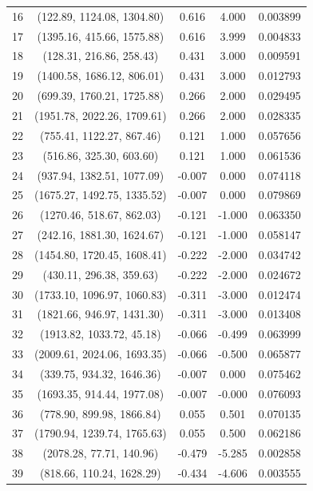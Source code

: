\begin{table}
\begin{tabular}{lcccc}
		16 &  (122.89, 1124.08, 1304.80)  &  0.616 &  4.000 &  0.003899 \\
		17 &  (1395.16, 415.66, 1575.88)  &  0.616 &  3.999 &  0.004833 \\
		18 &  (128.31, 216.86, 258.43)    &  0.431 &  3.000 &  0.009591 \\
		19 &  (1400.58, 1686.12, 806.01)  &  0.431 &  3.000 &  0.012793 \\
		20 &  (699.39, 1760.21, 1725.88)  &  0.266 &  2.000 &  0.029495 \\
		21 &  (1951.78, 2022.26, 1709.61) &  0.266 &  2.000 &  0.028335 \\
		22 &  (755.41, 1122.27, 867.46)   &  0.121 &  1.000 &  0.057656 \\
		23 &  (516.86, 325.30, 603.60)    &  0.121 &  1.000 &  0.061536 \\
		24 &  (937.94, 1382.51, 1077.09)  & -0.007 &  0.000 &  0.074118 \\
		25 &  (1675.27, 1492.75, 1335.52) & -0.007 &  0.000 &  0.079869 \\
		26 &  (1270.46, 518.67, 862.03)   & -0.121 & -1.000 &  0.063350 \\
		27 &  (242.16, 1881.30, 1624.67)  & -0.121 & -1.000 &  0.058147 \\
		28 &  (1454.80, 1720.45, 1608.41) & -0.222 & -2.000 &  0.034742 \\
		29 &  (430.11, 296.38, 359.63)    & -0.222 & -2.000 &  0.024672 \\
		30 &  (1733.10, 1096.97, 1060.83) & -0.311 & -3.000 &  0.012474 \\
		31 &  (1821.66, 946.97, 1431.30)  & -0.311 & -3.000 &  0.013408 \\
		32 &  (1913.82, 1033.72, 45.18)   & -0.066 & -0.499 &  0.063999 \\
		33 &  (2009.61, 2024.06, 1693.35) & -0.066 & -0.500 &  0.065877 \\
		34 &  (339.75, 934.32, 1646.36)   & -0.007 &  0.000 &  0.075462 \\
		35 &  (1693.35, 914.44, 1977.08)  & -0.007 & -0.000 &  0.076093 \\
		36 &  (778.90, 899.98, 1866.84)   &  0.055 &  0.501 &  0.070135 \\
		37 &  (1790.94, 1239.74, 1765.63) &  0.055 &  0.500 &  0.062186 \\
		38 &  (2078.28, 77.71, 140.96)    & -0.479 & -5.285 &  0.002858 \\
		39 &  (818.66, 110.24, 1628.29)   & -0.434 & -4.606 &  0.003555 \\
		\hline
	\end{tabular}
\end{table}


